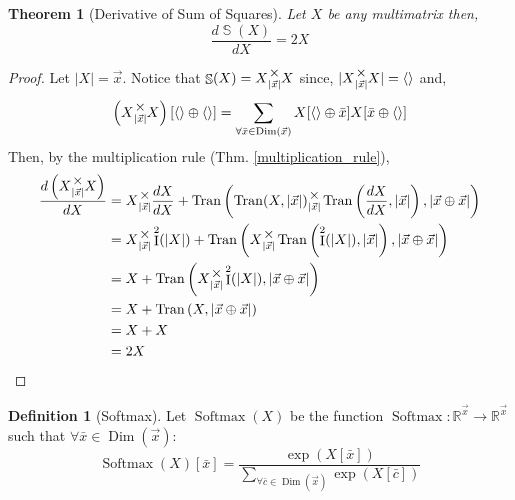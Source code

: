 \documentclass[12pt]{book}
\theoremstyle{plain}
\newtheorem{theorem}{Theorem}[chapter]
\theoremstyle{definition}
\newtheorem{definition}{Definition}[chapter]
\theoremstyle{ppart}
\theoremstyle{case}
\theoremstyle{solution}
\DeclareMathOperator{\Dim}{Dim}
\DeclareMathOperator{\Ident}{I}
\DeclareMathOperator{\Tran}{Tran}
\DeclareMathOperator{\SoS}{\mathbb{S}}
\DeclareMathOperator{\Softmax}{Softmax}
\newcommand{\mmult}[1]{\text{\raisebox{1ex}{$\underset{#1}{\times}$}}}
\begin{document}
\begin{theorem}[Derivative of Sum of Squares]
Let $X$ be any multimatrix then,
\[ \frac{d \SoS(X)}{dX} = 2X \]
\end{theorem}
\begin{proof}
Let $|X| = \vec{x}$. Notice that $\SoS(X) = X \mmult{|\vec{x}|} X$ since,
$|X \mmult{|\vec{x}|} X| = \left<\right>$ and,
\[
  \left(X \mmult{|\vec{x}|} X\right)[\left<\right> \oplus \left<\right>]
  =
  \sum_{\forall \bar{x} \in \Dim(\vec{x})}
    X[\left<\right> \oplus \bar{x}]
    X[\bar{x} \oplus \left<\right>]
\]
Then, by the multiplication rule (Thm. \ref{multiplication_rule}),
\begin{align*}
  \frac{d\left(X \mmult{|\vec{x}|} X\right)}{dX}
  &=
  X \mmult{|\vec{x}|} \frac{dX}{dX} +
  \Tran\left(
    \Tran(X, |\vec{x}|)
      \mmult{|\vec{x}|}
    \Tran\left(\frac{dX}{dX}, |\vec{x}|\right),
    |\vec{x} \oplus \vec{x}|
  \right) \\
  &=
  X \mmult{|\vec{x}|} \Ident^2(|X|) +
  \Tran\left(
    X
      \mmult{|\vec{x}|}
    \Tran\left(\Ident^2(|X|), |\vec{x}|\right),
    |\vec{x} \oplus \vec{x}|
  \right) \\
  &=
  X +
  \Tran\left(
    X
      \mmult{|\vec{x}|}
    \Ident^2(|X|),
    |\vec{x} \oplus \vec{x}|
  \right) \\
  &=
  X +
  \Tran\left(
    X,
    |\vec{x} \oplus \vec{x}|
  \right) \\
  &= X + X \\
  &= 2X
\end{align*}
\end{proof}

\begin{definition}[Softmax]
Let $\Softmax(X)$ be the function
$\Softmax : \mathbb{R}^{\vec{x}} \to \mathbb{R}^{\vec{x}}$
such that $\forall \bar{x} \in \Dim(\vec{x}):$
\[
  \Softmax(X)[\bar{x}] = \frac{
		\exp(X[\bar{x}])
	}{
		\sum_{\forall \bar{c} \in \Dim(\vec{x})} \exp(X[\bar{c}])
	}
\]
\end{definition}
\end{document}
